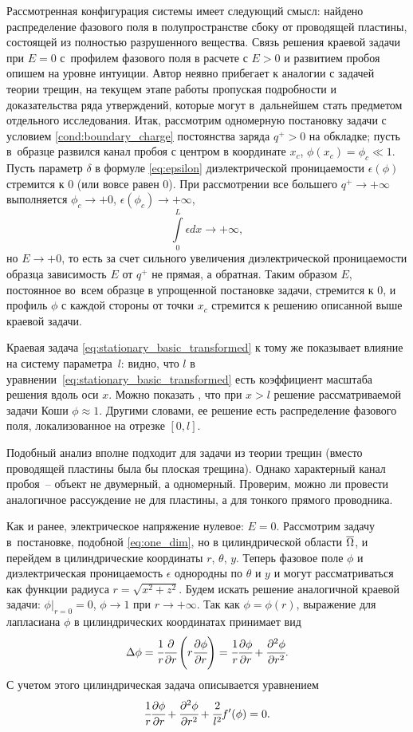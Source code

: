 Рассмотренная конфигурация системы имеет следующий смысл: найдено распределение фазового поля в полупространстве сбоку от проводящей пластины, состоящей из полностью разрушенного вещества. Связь решения краевой задачи при $E = 0$ с~профилем фазового поля в расчете с $E > 0$ и развитием пробоя опишем на уровне интуиции. Автор неявно прибегает к аналогии с задачей теории трещин, на текущем этапе работы пропуская подробности и доказательства ряда утверждений, которые могут в~дальнейшем стать предметом отдельного исследования. Итак, рассмотрим одномерную постановку задачи с условием \eqref{cond:boundary_charge} постоянства заряда $q^+ > 0$ на обкладке; пусть в~образце развился канал пробоя с центром в координате $x_c$, $\phi(x_c) = \phi_c \ll 1$. Пусть параметр $\delta$ в формуле \eqref{eq:epsilon} диэлектрической проницаемости $\epsilon(\phi)$ стремится к $0$ (или вовсе равен $0$). При рассмотрении все большего $q^+ \to +\infty$ выполняется $\phi_c \to +0$, $\epsilon(\phi_c) \to +\infty$,
\[
    \int\limits_0^L \epsilon dx \to +\infty,
\]
но $E \to +0$, то есть за счет сильного увеличения диэлектрической проницаемости образца зависимость $E$ от $q^+$ не прямая, а обратная. Таким образом $E$, постоянное во~всем образце в упрощенной постановке задачи, стремится к $0$, и профиль $\phi$ с каждой стороны от точки $x_c$ стремится к решению описанной выше краевой задачи.

Краевая задача \eqref{eq:stationary_basic_transformed} к тому же показывает влияние на систему параметра~$l$: видно, что $l$ в уравнении~\eqref{eq:stationary_basic_transformed} есть коэффициент масштаба решения вдоль оси $x$. Можно показать \cite{zipunova_higher_codimension}, что при $x > l$ решение рассматриваемой задачи Коши $\phi \approx 1$. Другими словами, ее решение есть распределение фазового поля, локализованное на отрезке $[0, l]$.

Подобный анализ вполне подходит для задачи из теории трещин (вместо проводящей пластины была бы плоская трещина). Однако характерный канал пробоя~-- объект не двумерный, а одномерный. Проверим, можно ли провести аналогичное рассуждение не для пластины, а для тонкого прямого проводника.

Как и ранее, электрическое напряжение нулевое: $E = 0$. Рассмотрим задачу в~постановке, подобной \eqref{eq:one_dim}, но в цилиндрической области ${\overline{\Omega}}$, и перейдем в цилиндрические координаты $r$, $\theta$, $y$. Теперь фазовое поле $\phi$ и диэлектрическая проницаемость $\epsilon$ однородны по $\theta$ и $y$ и могут рассматриваться как функции радиуса $r = \sqrt{x^2 + z^2}$. Будем искать решение аналогичной краевой задачи: $\phi|_{r = 0} = 0$, $\phi \to 1$ при $r \to +\infty$. Так как $\phi = \phi(r)$, выражение для лапласиана $\phi$ в цилиндрических координатах принимает вид
\[
    \Delta \phi = \cfrac{1}{r} \cfrac{\partial }{\partial r} \left( r \cfrac{\partial \phi}{\partial r} \right) = \cfrac{1}{r} \cfrac{\partial \phi}{\partial r} + \cfrac{\partial^2 \phi}{\partial r^2}.
\]
С учетом этого цилиндрическая задача описывается уравнением
\begin{equation}
    \cfrac{1}{r} \cfrac{\partial \phi}{\partial r} + \cfrac{\partial^2 \phi}{\partial r^2} + \cfrac{2}{l^2} f'(\phi) = 0.
    \label{eq:stationary_basic_cylindrical}
\end{equation}

